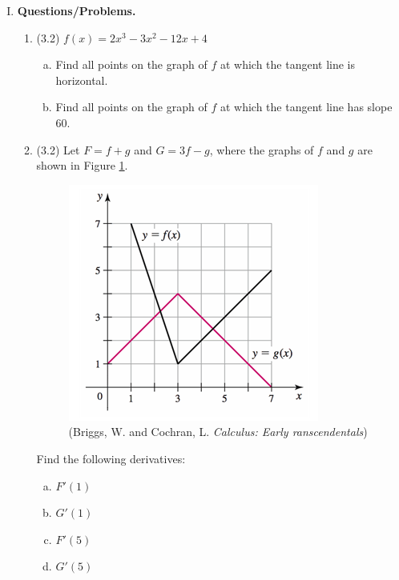 \documentclass[11pt,letterpaper]{article}
\begin{document}
\begin{enumerate}[I.]
\begin{enumerate}[1.]
	\end{enumerate}
	
\vspace{1pc}
\item \textbf{Questions/Problems.} 
	\begin{enumerate}[1.]
	\item (3.2) $f(x)=2x^3-3x^2-12x+4$
		\begin{enumerate}[(a)]
		\item Find all points on the graph of $f$ at which the tangent line is horizontal.
		\item Find all points on the graph of $f$ at which the tangent line has slope 60.
		\end{enumerate}
		
	\item (3.2) Let $F=f+g$ and $G=3f-g$, where the graphs of $f$ and $g$ are shown in Figure \ref{fig:graphDeriv}.
	
	\vspace{-0.5pc}  
	\begin{figure}[h]
	\begin{center}
	\includegraphics[scale=0.8]{Exam2graphDeriv.png}
	\caption{(Briggs, W. and Cochran, L. \emph{Calculus: Early ranscendentals})}
	\label{fig:graphDeriv}
	\end{center}
	\end{figure}
	
	Find the following derivatives:
		\begin{enumerate}[(a)]
		\item $F'(1)$
		\item $G'(1)$
		\item $F'(5)$
		\item $G'(5)$
		\end{enumerate}
		

\end{enumerate}
\end{enumerate}
\end{document}
